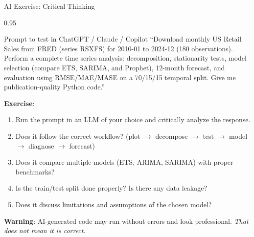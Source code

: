\documentclass[9pt, aspectratio=169, t]{beamer}
\begin{document}
\begin{frame}{AI Exercise: Critical Thinking}
    \begin{cminipage}{0.95\textwidth}
    \vspace{-3mm}
    \begin{block}{\footnotesize Prompt to test in ChatGPT / Claude / Copilot}
        {\footnotesize
        ``Download monthly US Retail Sales from FRED (series RSXFS) for 2010-01 to 2024-12 (180 observations). Perform a complete time series analysis: decomposition, stationarity tests, model selection (compare ETS, SARIMA, and Prophet), 12-month forecast, and evaluation using RMSE/MAE/MASE on a 70/15/15 temporal split. Give me publication-quality Python code.''
        }
    \end{block}
    \vspace{-2mm}
    {\footnotesize
    \textbf{Exercise}:
    \begin{enumerate}\setlength{\itemsep}{0pt}
        \item Run the prompt in an LLM of your choice and critically analyze the response.
        \item Does it follow the correct workflow? (plot $\to$ decompose $\to$ test $\to$ model $\to$ diagnose $\to$ forecast)
        \item Does it compare multiple models (ETS, ARIMA, SARIMA) with proper benchmarks?
        \item Is the train/test split done properly? Is there any data leakage?
        \item Does it discuss limitations and assumptions of the chosen model?
    \end{enumerate}
    }
    \vspace{-2mm}
    \begin{alertblock}{}
        {\footnotesize \textbf{Warning}: AI-generated code may run without errors and look professional. \textit{That does not mean it is correct.}}
    \end{alertblock}
    \end{cminipage}
\end{frame}
\end{document}
